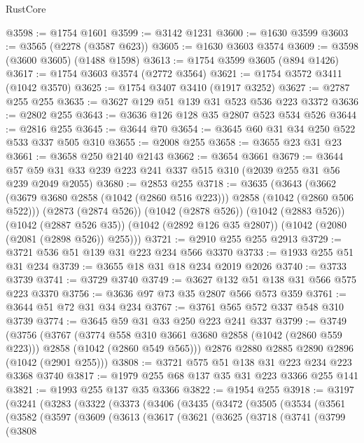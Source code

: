 \begin{lexlean}{RustCore}
\begin{coremodule}
@3598 := @1754 @1601
@3599 := @3142 @1231
@3600 := @1630 @3599
@3603 := @3565 (@2278 (@3587 @623))
@3605 := @1630 @3603 @3574
@3609 := @3598 (@3600 @3605) (@1488 @1598)
@3613 := @1754 @3599 @3605 (@894 @1426)
@3617 := @1754 @3603 @3574 (@2772 @3564)
@3621 := @1754 @3572 @3411 (@1042 @3570)
@3625 := @1754 @3407 @3410 (@1917 @3252)
@3627 := @2787 @255 @255
@3635 := @3627 @129 @51 @139 @31 @523 @536 @223 @3372
@3636 := @2802 @255
@3643 := @3636 @126 @128 @35 @2807 @523 @534 @526
@3644 := @2816 @255
@3645 := @3644 @70
@3654 := @3645 @60 @31 @34 @250 @522 @533 @337 @505 @310
@3655 := @2008 @255
@3658 := @3655 @23 @31 @23
@3661 := @3658 @250 @2140 @2143
@3662 := @3654 @3661
@3679 := @3644 @57 @59 @31 @33 @239 @223 @241 @337 @515 @310 (@2039 @255 @31 @56 @239 @2049 @2055)
@3680 := @2853 @255
@3718 := @3635
    (@3643
      (@3662 (@3679 @3680 @2858 (@1042 (@2860 @516 @223))) @2858 (@1042 (@2860 @506 @522)))
      (@2873 (@2874 @526))
      (@1042 (@2878 @526))
      (@1042 (@2883 @526))
      (@1042 (@2887 @526 @35))
      (@1042 (@2892 @126 @35 @2807))
      (@1042 (@2080 (@2081 (@2898 @526)) @255)))
@3721 := @2910 @255 @255 @2913
@3729 := @3721 @536 @51 @139 @31 @223 @234 @566 @3370
@3733 := @1933 @255 @51 @31 @234
@3739 := @3655 @18 @31 @18 @234 @2019 @2026
@3740 := @3733 @3739
@3741 := @3729 @3740
@3749 := @3627 @132 @51 @138 @31 @566 @575 @223 @3370
@3756 := @3636 @97 @73 @35 @2807 @566 @573 @359
@3761 := @3644 @51 @72 @31 @34 @234
@3767 := @3761 @565 @572 @337 @548 @310 @3739
@3774 := @3645 @59 @31 @33 @250 @223 @241 @337
@3799 := @3749
    (@3756
      (@3767
        (@3774 @558 @310 @3661 @3680 @2858 (@1042 (@2860 @559 @223)))
        @2858
        (@1042 (@2860 @549 @565)))
      @2876
      @2880
      @2885
      @2890
      @2896
      (@1042 (@2901 @255)))
@3808 := @3721 @575 @51 @138 @31 @223 @234 @223 @3368 @3740
@3817 := @1979 @255 @68 @137 @35 @31 @223 @3366 @255 @141
@3821 := @1993 @255 @137 @35 @3366
@3822 := @1954 @255
@3918 := @3197
    (@3241
      (@3283
        (@3322
          (@3373
            (@3406
              (@3435
                (@3472
                  (@3505
                    (@3534
                      (@3561
                        (@3582
                          (@3597
                            (@3609
                              (@3613
                                (@3617
                                  (@3621
                                    (@3625
                                      (@3718
                                        (@3741
                                          (@3799
                                            (@3808

\end{coremodule}
\end{lexlean}

